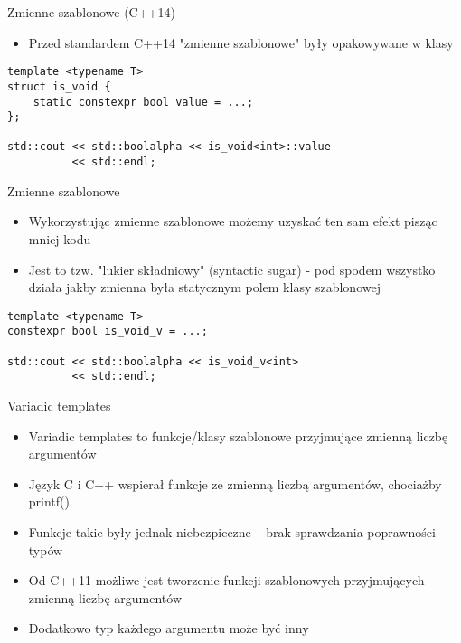 \documentclass[11pt]{beamer}
\begin{document}
\begin{frame}[fragile]{Zmienne szablonowe (C++14)}
    \begin{itemize}
        \item Przed standardem C++14 "zmienne szablonowe" były opakowywane w klasy
    \end{itemize}
    \begin{lstlisting}[frame=single]
template <typename T>
struct is_void {
    static constexpr bool value = ...;
};

std::cout << std::boolalpha << is_void<int>::value
          << std::endl;
    \end{lstlisting}
\end{frame}

\begin{frame}[fragile]{Zmienne szablonowe}
    \begin{itemize}
        \item Wykorzystując zmienne szablonowe możemy uzyskać ten sam efekt pisząc mniej kodu
        \item Jest to tzw. "lukier składniowy" (syntactic sugar) - pod spodem wszystko działa jakby zmienna była statycznym polem klasy szablonowej
    \end{itemize}
    \begin{lstlisting}[frame=single]
template <typename T>
constexpr bool is_void_v = ...;

std::cout << std::boolalpha << is_void_v<int>
          << std::endl;
    \end{lstlisting}
\end{frame}

\begin{frame}[fragile]{Variadic templates}
    \begin{itemize}
        \item Variadic templates to funkcje/klasy szablonowe przyjmujące zmienną liczbę argumentów
        \item Język C i C++ wspierał funkcje ze zmienną liczbą argumentów, chociażby printf()
        \item Funkcje takie były jednak niebezpieczne -- brak sprawdzania poprawności typów
        \item Od C++11 możliwe jest tworzenie funkcji szablonowych przyjmujących zmienną liczbę argumentów
        \item Dodatkowo typ każdego argumentu może być inny
    \end{itemize}
\end{frame}
\end{document}
